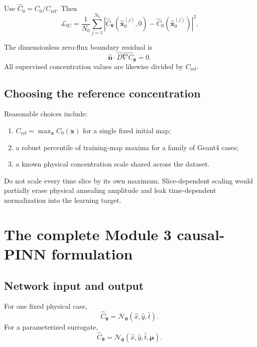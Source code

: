 \documentclass[11pt]{article}
\newcommand{\thetav}{\bm{\theta}}
\newcommand{\muv}{\bm{\mu}}
\newcommand{\xv}{\bm{x}}
\newcommand{\Lic}{\mathcal{L}_{\mathrm{IC}}}
\newcommand{\Cref}{C_{\mathrm{ref}}}
\begin{document}
Use $\hat{C}_0=C_0/\Cref$. Then
\begin{equation}
\widehat{\Lic}
=
\frac{1}{N_0}
\sum_{j=1}^{N_0}
\left|
\widehat{C}_{\thetav}(\hat{\xv}_0^{(j)},0)
-\hat{C}_0(\hat{\xv}_0^{(j)})
\right|^2.
\end{equation}

The dimensionless zero-flux boundary residual is
\begin{equation}
\hat{\mathbf n}\cdot
\hat{D}\hat{\nabla}\widehat{C}_{\thetav}=0.
\end{equation}
All supervised concentration values are likewise divided by $\Cref$.

\subsection{Choosing the reference concentration}

Reasonable choices include:
\begin{enumerate}[label=\arabic*.]
    \item $\Cref=\max_{\xv}C_0(\xv)$ for a single fixed initial map;
    \item a robust percentile of training-map maxima for a family of Geant4 cases;
    \item a known physical concentration scale shared across the dataset.
\end{enumerate}
Do not scale every time slice by its own maximum. Slice-dependent scaling would partially erase physical annealing amplitude and leak time-dependent normalization into the learning target.

\section{The complete Module 3 causal-PINN formulation}

\subsection{Network input and output}

For one fixed physical case,
\begin{equation}
\widehat{C}_{\thetav}
=
\mathcal{N}_{\thetav}(\hat{x},\hat{y},\hat{t}).
\label{eq:single_case_network}
\end{equation}
For a parameterized surrogate,
\begin{equation}
\widehat{C}_{\thetav}
=
\mathcal{N}_{\thetav}
(\hat{x},\hat{y},\hat{t},\muv).
\label{eq:parametric_network}
\end{equation}
\end{document}
